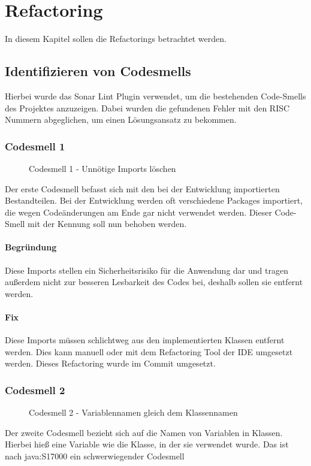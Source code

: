 \chapter{Refactoring}
In diesem Kapitel sollen die Refactorings betrachtet werden.
    \section{Identifizieren von Codesmells}
    Hierbei wurde das Sonar Lint Plugin verwendet, um die bestehenden Code-Smells des Projektes anzuzeigen. Dabei wurden die gefundenen Fehler mit den RISC Nummern abgeglichen, um einen Lösungsansatz zu bekommen.
        \subsection{Codesmell 1}
        \begin{figure}[h]
        	\centering
        	\caption{Codesmell 1 - Unnötige Imports löschen}
        	\label{codesmell_1}
        \end{figure}
        Der erste Codesmell befasst sich mit den bei der Entwicklung importierten Bestandteilen. Bei der Entwicklung werden oft verschiedene Packages importiert, die wegen Codeänderungen am Ende gar nicht verwendet werden. Dieser Code-Smell mit der Kennung  soll nun behoben werden. 
        \subsubsection{Begründung}
        Diese Imports stellen ein Sicherheitsrisiko für die Anwendung dar und tragen außerdem nicht zur besseren Lesbarkeit des Codes bei, deshalb sollen sie entfernt werden.
        \subsubsection{Fix}
        Diese Imports müssen schlichtweg aus den implementierten Klassen entfernt werden. Dies kann manuell oder mit dem Refactoring Tool der IDE umgesetzt werden. Dieses Refactoring wurde im Commit  umgesetzt.
        
        \subsection{Codesmell 2}
        \begin{figure}[h]
        	\centering
        	\caption{Codesmell 2 - Variablennamen gleich dem Klassennamen}
        	\label{codesmell_2}
        \end{figure}
        Der zweite Codesmell bezieht sich auf die Namen von Variablen in Klassen. Hierbei hieß eine Variable wie die Klasse, in der sie verwendet wurde. Das ist nach java:S17000 ein schwerwiegender Codesmell
